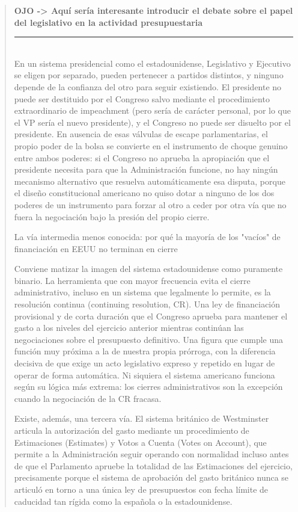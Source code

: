 \documentclass[10pt,a4paper]{article}
\newenvironment{specialblock}[1]{%
      \begin{quote} %
      \small %
      \noindent\textbf{#1}\\[-0.3em] %
      \rule{\linewidth}{0.4pt}\\[0.6em]}{
      \end{quote}}
\begin{document}
\begin{specialblock}{\textbf{OJO ->} Aquí sería interesante introducir el debate sobre el papel del legislativo en la actividad presupuestaria}
    En un sistema presidencial como el estadounidense, Legislativo y Ejecutivo se eligen por separado, pueden pertenecer a partidos distintos, y ninguno depende de la confianza del otro para seguir existiendo. El presidente no puede ser destituido por el Congreso salvo mediante el procedimiento extraordinario de impeachment (pero sería de carácter personal, por lo que el VP sería el nuevo presidente), y el Congreso no puede ser disuelto por el presidente. En ausencia de esas válvulas de escape parlamentarias, el propio poder de la bolsa se convierte en el instrumento de choque genuino entre ambos poderes: si el Congreso no aprueba la apropiación que el presidente necesita para que la Administración funcione, no hay ningún mecanismo alternativo que resuelva automáticamente esa disputa, porque el diseño constitucional americano no quiso dotar a ninguno de los dos poderes de un instrumento para forzar al otro a ceder por otra vía que no fuera la negociación bajo la presión del propio cierre.
    
    La vía intermedia menos conocida: por qué la mayoría de los "vacíos" de financiación en EEUU no terminan en cierre
    
    Conviene matizar la imagen del sistema estadounidense como puramente binario. La herramienta que con mayor frecuencia evita el cierre administrativo, incluso en un sistema que legalmente lo permite, es la resolución continua (continuing resolution, CR). Una ley de financiación provisional y de corta duración que el Congreso aprueba para mantener el gasto a los niveles del ejercicio anterior mientras continúan las negociaciones sobre el presupuesto definitivo. Una figura que cumple una función muy próxima a la de nuestra propia prórroga, con la diferencia decisiva de que exige un acto legislativo expreso y repetido en lugar de operar de forma automática. Ni siquiera el sistema americano funciona según su lógica más extrema: los cierres administrativos son la excepción cuando la negociación de la CR fracasa.
    
    Existe, además, una tercera vía. El sistema británico de Westminster articula la autorización del gasto mediante un procedimiento de Estimaciones (Estimates) y Votos a Cuenta (Votes on Account), que permite a la Administración seguir operando con normalidad incluso antes de que el Parlamento apruebe la totalidad de las Estimaciones del ejercicio, precisamente porque el sistema de aprobación del gasto británico nunca se articuló en torno a una única ley de presupuestos con fecha límite de caducidad tan rígida como la española o la estadounidense.
    

\end{specialblock}
\end{document}
